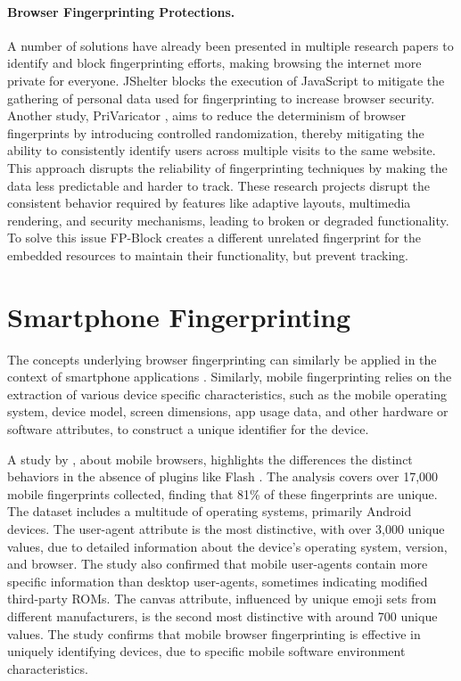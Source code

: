 \documentclass[11pt,
  oneside,openany,    %
]{scrreprt}
\begin{document}
\paragraph{Browser Fingerprinting Protections.}
\label{par:browser_fingerprint_protect}
A number of solutions have already been presented in multiple research papers to identify and block fingerprinting efforts, making browsing the internet more private for everyone. 
JShelter \cite{DBLP:conf/secrypt/PolcakSMHM23} blocks the execution of JavaScript to mitigate the gathering of personal data used for fingerprinting to increase browser security.
Another study, PriVaricator \cite{DBLP:conf/www/NikiforakisJL15}, aims to reduce the determinism of browser fingerprints by introducing controlled randomization, thereby mitigating the ability to consistently identify users across multiple visits to the same website.
This approach disrupts the reliability of fingerprinting techniques by making the data less predictable and harder to track.
These research projects disrupt the consistent behavior required by features like adaptive layouts, multimedia rendering, and security mechanisms, leading to broken or degraded functionality. 
To solve this issue FP-Block \cite{DBLP:conf/esorics/TorresJM15} creates a different unrelated fingerprint for the embedded resources to maintain their functionality, but prevent tracking.

\section{Smartphone Fingerprinting}
\label{sec:smartphone_fingerprint}
The concepts underlying browser fingerprinting can similarly be applied in the context of smartphone applications \cite{DBLP:conf/IEEEares/PalfingerP20}. 
Similarly, mobile fingerprinting relies on the extraction of various device specific characteristics, such as the mobile operating system, device model, screen dimensions, app usage data, and other hardware or software attributes, to construct a unique identifier for the device.

A study by \citeauthor{DBLP:conf/www/Gomez-BoixLB18}, about mobile browsers, highlights the differences the distinct behaviors in the absence of plugins like Flash \cite{DBLP:conf/www/Gomez-BoixLB18}.
The analysis covers over 17,000 mobile fingerprints collected, finding that 81\% of these fingerprints are unique. 
The dataset includes a multitude of operating systems, primarily Android devices.
The user-agent attribute is the most distinctive, with over 3,000 unique values, due to detailed information about the device's operating system, version, and browser. 
The study also confirmed that mobile user-agents contain more specific information than desktop user-agents, sometimes indicating modified third-party ROMs.
The canvas attribute, influenced by unique emoji sets from different manufacturers, is the second most distinctive with around 700 unique values.
The study confirms that mobile browser fingerprinting is effective in uniquely identifying devices, due to specific mobile software environment characteristics.
\end{document}
